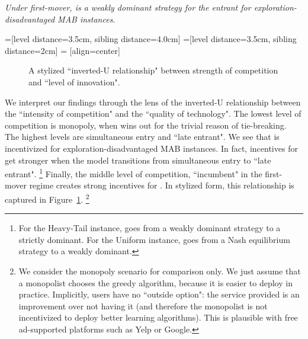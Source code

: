 \documentclass[../competing_bandits_with_appendix.tex]{subfiles}
\begin{document}
\begin{finding}\label{find:temp-monopoly-entrant}
\textit{Under first-mover, \DynamicGreedy is a weakly dominant strategy for the entrant for exploration-disadvantaged MAB instances.
}
\end{finding}


=[level distance=3.5cm, sibling distance=4.0cm]
=[level distance=3.5cm, sibling distance=2cm]
 = [align=center]

\begin{figure}[t]
\begin{center}
 \caption{\footnotesize A stylized ``inverted-U relationship" between strength of competition and ``level of innovation".}
\label{fig:inverted-U-expts}
\end{center}
\end{figure}

We interpret our findings through the lens of the inverted-U relationship between the ``intensity of competition" and the ``quality of technology". The lowest level of competition is monopoly, when \DynamicGreedy wins out for the trivial reason of tie-breaking. The highest levels are simultaneous entry and ``late entrant". We see that \DynamicGreedy is incentivized for exploration-disadvantaged MAB instances. In fact, incentives for \DynamicGreedy get stronger when the model transitions from simultaneous entry to ``late entrant".%
\footnote{For the Heavy-Tail instance, \DynamicGreedy goes from a weakly dominant strategy to a strictly dominant. For the Uniform instance, \DynamicGreedy goes from a Nash equilibrium strategy to a weakly dominant.}
Finally, the middle level of competition, ``incumbent" in the first-mover regime creates strong incentives for \Thompson. In stylized form, this relationship is captured in Figure~\ref{fig:inverted-U-expts}.%
\footnote{We consider the monopoly scenario for comparison only. We just assume that a monopolist chooses the greedy algorithm, because it is easier to deploy in practice. Implicitly, users have no ``outside option": the service provided is an improvement over not having it (and therefore the monopolist is not incentivized to deploy better learning algorithms). This is plausible with free ad-supported platforms such as Yelp or Google.}
\end{document}
